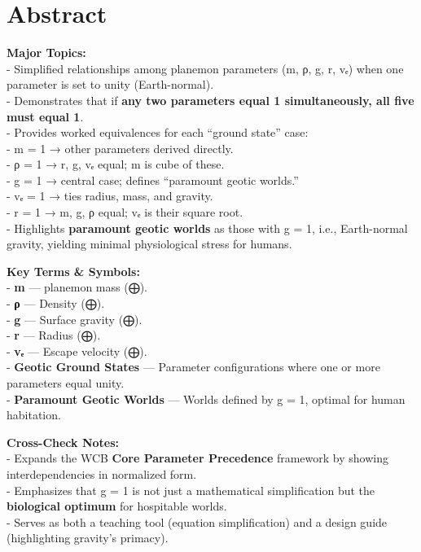 \documentclass[
  letterpaper,
]{book}
\begin{document}
\chapter{Abstract}\label{abstract-23}

\textbf{Major Topics:}\\
- Simplified relationships among planemon parameters (m, ρ, g, r, vₑ)
when one parameter is set to unity (Earth-normal).\\
- Demonstrates that if \textbf{any two parameters equal 1
simultaneously, all five must equal 1}.\\
- Provides worked equivalences for each ``ground state'' case:\\
- m = 1 → other parameters derived directly.\\
- ρ = 1 → r, g, vₑ equal; m is cube of these.\\
- g = 1 → central case; defines ``paramount geotic worlds.''\\
- vₑ = 1 → ties radius, mass, and gravity.\\
- r = 1 → m, g, ρ equal; vₑ is their square root.\\
- Highlights \textbf{paramount geotic worlds} as those with g = 1, i.e.,
Earth-normal gravity, yielding minimal physiological stress for humans.

\textbf{Key Terms \& Symbols:}\\
- \textbf{m} --- planemon mass (⨁).\\
- \textbf{ρ} --- Density (⨁).\\
- \textbf{g} --- Surface gravity (⨁).\\
- \textbf{r} --- Radius (⨁).\\
- \textbf{vₑ} --- Escape velocity (⨁).\\
- \textbf{Geotic Ground States} --- Parameter configurations where one
or more parameters equal unity.\\
- \textbf{Paramount Geotic Worlds} --- Worlds defined by g = 1, optimal
for human habitation.

\textbf{Cross-Check Notes:}\\
- Expands the WCB \textbf{Core Parameter Precedence} framework by
showing interdependencies in normalized form.\\
- Emphasizes that g = 1 is not just a mathematical simplification but
the \textbf{biological optimum} for hospitable worlds.\\
- Serves as both a teaching tool (equation simplification) and a design
guide (highlighting gravity's primacy).
\end{document}
